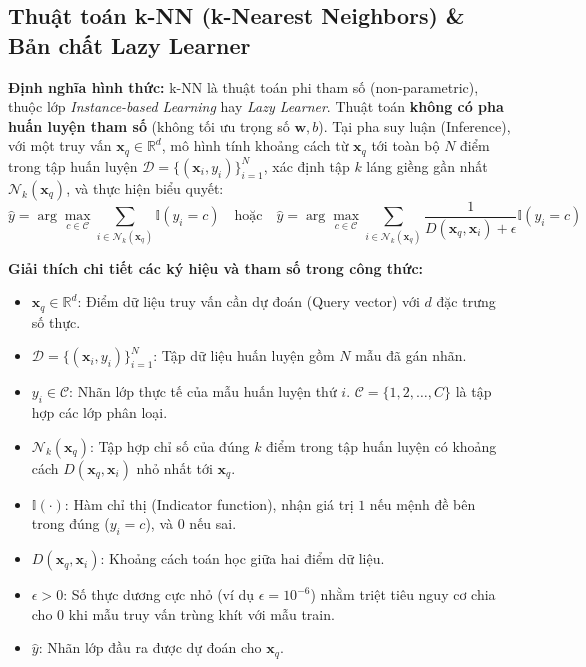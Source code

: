 \documentclass[10pt,a4paper]{article}
\begin{document}
\subsection{Thuật toán k-NN (k-Nearest Neighbors) \& Bản chất Lazy Learner}
\textbf{Định nghĩa hình thức:} k-NN là thuật toán phi tham số (non-parametric), thuộc lớp \textit{Instance-based Learning} hay \textit{Lazy Learner}. Thuật toán \textbf{không có pha huấn luyện tham số} (không tối ưu trọng số $\mathbf{w}, b$). Tại pha suy luận (Inference), với một truy vấn $\mathbf{x}_q \in \mathbb{R}^d$, mô hình tính khoảng cách từ $\mathbf{x}_q$ tới toàn bộ $N$ điểm trong tập huấn luyện $\mathcal{D} = \{(\mathbf{x}_i, y_i)\}_{i=1}^N$, xác định tập $k$ láng giềng gần nhất $\mathcal{N}_k(\mathbf{x}_q)$, và thực hiện biểu quyết:
\begin{equation}
    \hat{y} = \arg\max_{c \in \mathcal{C}} \sum_{i \in \mathcal{N}_k(\mathbf{x}_q)} \mathbb{I}(y_i = c) \quad \text{hoặc} \quad \hat{y} = \arg\max_{c \in \mathcal{C}} \sum_{i \in \mathcal{N}_k(\mathbf{x}_q)} \frac{1}{D(\mathbf{x}_q, \mathbf{x}_i) + \epsilon} \mathbb{I}(y_i = c)
\end{equation}

\textbf{Giải thích chi tiết các ký hiệu và tham số trong công thức:}
\begin{itemize}[leftmargin=*]
    \item $\mathbf{x}_q \in \mathbb{R}^d$: Điểm dữ liệu truy vấn cần dự đoán (Query vector) với $d$ đặc trưng số thực.
    \item $\mathcal{D} = \{(\mathbf{x}_i, y_i)\}_{i=1}^N$: Tập dữ liệu huấn luyện gồm $N$ mẫu đã gán nhãn.
    \item $y_i \in \mathcal{C}$: Nhãn lớp thực tế của mẫu huấn luyện thứ $i$. $\mathcal{C} = \{1, 2, \dots, C\}$ là tập hợp các lớp phân loại.
    \item $\mathcal{N}_k(\mathbf{x}_q)$: Tập hợp chỉ số của đúng $k$ điểm trong tập huấn luyện có khoảng cách $D(\mathbf{x}_q, \mathbf{x}_i)$ nhỏ nhất tới $\mathbf{x}_q$.
    \item $\mathbb{I}(\cdot)$: Hàm chỉ thị (Indicator function), nhận giá trị $1$ nếu mệnh đề bên trong đúng ($y_i = c$), và $0$ nếu sai.
    \item $D(\mathbf{x}_q, \mathbf{x}_i)$: Khoảng cách toán học giữa hai điểm dữ liệu.
    \item $\epsilon > 0$: Số thực dương cực nhỏ (ví dụ $\epsilon = 10^{-6}$) nhằm triệt tiêu nguy cơ chia cho 0 khi mẫu truy vấn trùng khít với mẫu train.
    \item $\hat{y}$: Nhãn lớp đầu ra được dự đoán cho $\mathbf{x}_q$.
\end{itemize}
\end{document}
